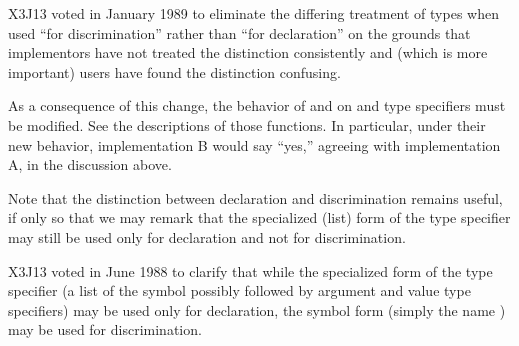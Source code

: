 \begin{new}
X3J13 voted in January 1989
to eliminate the differing treatment of types
when used ``for discrimination'' rather than ``for declaration'' on the grounds
that implementors have not treated the distinction consistently
and (which is more important) users have found the distinction confusing.

As a consequence of this change, the behavior of  and 
on  and  type specifiers must be modified.
See the descriptions of those functions.  In particular, under their new
behavior, implementation B would say ``yes,'' agreeing with implementation A,
in the discussion above.

Note that the distinction between declaration and discrimination remains
useful, if only so that we may remark that the specialized (list)
form of the
 type specifier may still be used only for declaration and
not for discrimination.
\end{new}

\begin{new}
X3J13 voted in June 1988  to clarify that
while the specialized form of the  type specifier
(a list of the symbol  possibly followed by
argument and value type specifiers)
may be used only for declaration, the symbol form (simply the name
) may be used for discrimination.
\end{new}

